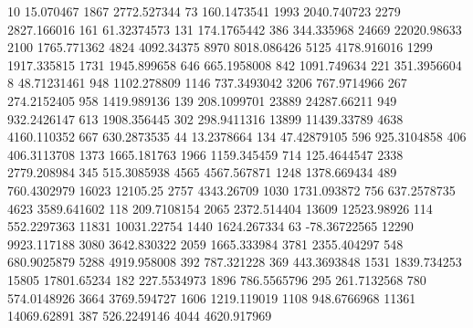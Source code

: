 10	15.070467
1867	2772.527344
73	160.1473541
1993	2040.740723
2279	2827.166016
161	61.32374573
131	174.1765442
386	344.335968
24669	22020.98633
2100	1765.771362
4824	4092.34375
8970	8018.086426
5125	4178.916016
1299	1917.335815
1731	1945.899658
646	665.1958008
842	1091.749634
221	351.3956604
8	48.71231461
948	1102.278809
1146	737.3493042
3206	767.9714966
267	274.2152405
958	1419.989136
139	208.1099701
23889	24287.66211
949	932.2426147
613	1908.356445
302	298.9411316
13899	11439.33789
4638	4160.110352
667	630.2873535
44	13.2378664
134	47.42879105
596	925.3104858
406	406.3113708
1373	1665.181763
1966	1159.345459
714	125.4644547
2338	2779.208984
345	515.3085938
4565	4567.567871
1248	1378.669434
489	760.4302979
16023	12105.25
2757	4343.26709
1030	1731.093872
756	637.2578735
4623	3589.641602
118	209.7108154
2065	2372.514404
13609	12523.98926
114	552.2297363
11831	10031.22754
1440	1624.267334
63	-78.36722565
12290	9923.117188
3080	3642.830322
2059	1665.333984
3781	2355.404297
548	680.9025879
5288	4919.958008
392	787.321228
369	443.3693848
1531	1839.734253
15805	17801.65234
182	227.5534973
1896	786.5565796
295	261.7132568
780	574.0148926
3664	3769.594727
1606	1219.119019
1108	948.6766968
11361	14069.62891
387	526.2249146
4044	4620.917969